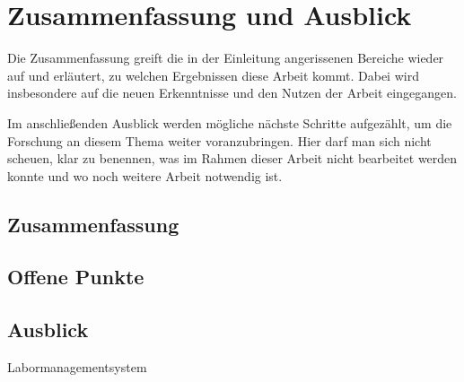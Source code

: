 
\chapter{Zusammenfassung und Ausblick}
\label{chapter-fazit}

Die Zusammenfassung greift die in der Einleitung angerissenen Bereiche wieder auf und erläutert, zu welchen Ergebnissen diese Arbeit kommt. Dabei wird insbesondere auf die neuen Erkenntnisse und den Nutzen der Arbeit eingegangen.

Im anschließenden Ausblick werden mögliche nächste Schritte aufgezählt, um die Forschung an diesem
Thema weiter voranzubringen. Hier darf man sich nicht scheuen, klar zu benennen, was im Rahmen
dieser Arbeit nicht bearbeitet werden konnte und wo noch weitere Arbeit notwendig ist.

\section{Zusammenfassung}
\section{Offene Punkte}
\section{Ausblick}

Labormanagementsystem
